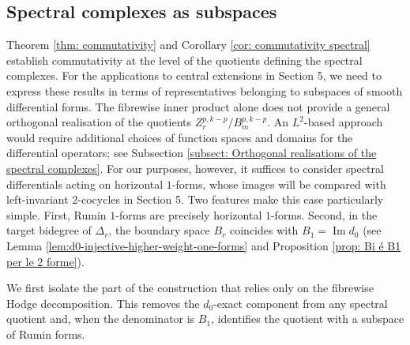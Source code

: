 \documentclass[dvipsnames]{amsart}
\theoremstyle{definition}
\theoremstyle{definition}
\numberwithin{equation}{section}
\begin{document}
\subsection{Spectral complexes as subspaces}
Theorem \ref{thm: commutativity} and Corollary \ref{cor: commutativity spectral} establish commutativity at the level of the quotients defining the spectral complexes. For the applications to central extensions in Section 5, we need to express these results in terms of representatives belonging to subspaces of smooth differential forms. The fibrewise inner product alone does not provide a general orthogonal realisation of the quotients $Z_r^{p,k-p}/B_m^{p,k-p}$. An $L^2$-based approach would require additional choices of function spaces and domains for the differential operators; see Subsection \ref{subsect: Orthogonal realisations of the spectral complexes}. For our purposes, however, it suffices to consider spectral differentials acting on horizontal $1$-forms, whose images will be compared with left-invariant $2$-cocycles in Section 5. Two features make this case particularly simple. First, Rumin $1$-forms are precisely horizontal $1$-forms. Second, in the target bidegree of $\Delta_r$, the boundary space $B_r$ coincides with $B_1=\operatorname{Im}d_0$ (see Lemma \ref{lem:d0-injective-higher-weight-one-forms} and Proposition \ref{prop: Bi é B1 per le 2 forme}).

We first isolate the part of the construction that relies only on the fibrewise Hodge decomposition. This removes the $d_0$-exact component from any spectral quotient and, when the denominator is $B_1$, identifies the quotient with a subspace of Rumin forms.
\end{document}
